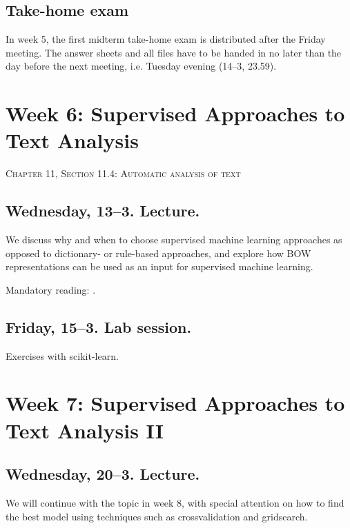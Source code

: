 \subsection*{Take-home exam}
In week 5, the first midterm take-home exam is distributed after the Friday meeting. The answer sheets and all files have to be handed in no later than the day before the next meeting, i.e. Tuesday evening (14--3, 23.59).






\section*{Week 6: Supervised Approaches to Text Analysis}
\textsc{ Chapter 11, Section 11.4: Automatic analysis of text}\\


\subsection*{Wednesday, 13--3. Lecture.}
We discuss why and when to choose supervised machine learning approaches as opposed to dictionary- or rule-based approaches, and explore how BOW representations can be used as an input for supervised machine learning.

Mandatory reading: \cite{Boumans2016}.


\subsection*{Friday, 15--3. Lab session.}
Exercises with scikit-learn.





\section*{Week 7: Supervised Approaches to Text Analysis II}


\subsection*{Wednesday, 20--3. Lecture.}
We will continue with the topic in week 8, with special attention on how to find the best model using techniques such as crossvalidation and gridsearch.

